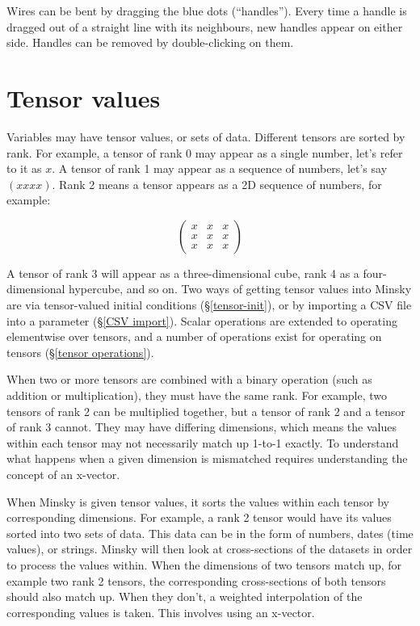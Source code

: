 Wires can be bent by dragging the blue dots (``handles''). Every time
a handle is dragged out of a straight line with its neighbours, new
handles appear on either side. Handles can be removed by
double-clicking on them.

\section{Tensor values}

Variables may have tensor values, or sets of data. Different tensors
are sorted by rank. For example, a tensor of rank 0 may appear as a
single number, let's refer to it as $x$. A tensor of rank 1 may appear
as a sequence of numbers, let's say $(x x x x)$. Rank 2 means a tensor
appears as a 2D sequence of numbers, for example:

\begin{displaymath}
  \left(
  \begin{array}{ccc}
    x& x& x\\
    x& x& x\\
    x& x& x
  \end{array}
  \right)
\end{displaymath}

A tensor of rank 3 will appear as a three-dimensional cube,
rank 4 as a four-dimensional hypercube, and so on. Two 
ways of getting tensor values into Minsky are via tensor-valued 
initial conditions (\S\ref{tensor-init}), or by importing a CSV 
file into a parameter (\S\ref{CSV import}). Scalar 
operations are extended to operating elementwise over tensors, 
and a number of operations exist for operating on tensors 
(\S\ref{tensor operations}).

When two or more tensors are combined with a binary operation (such 
as addition or multiplication), they must have the same rank. For example,
two tensors of rank 2 can be multiplied together, but a tensor of rank 2 and 
a tensor of rank 3 cannot. They may have differing dimensions, which means
the values within each tensor may not necessarily match up 1-to-1 exactly.
To understand what happens when a given dimension is mismatched requires 
understanding the concept of an x-vector.

When Minsky is given tensor values, it sorts the values within each tensor
by corresponding dimensions. For example, a rank 2 tensor would have its
values sorted into two sets of data. This data can be in the form of numbers,
dates (time values), or strings. Minsky will then look at cross-sections of the
datasets in order to process the values within. When the dimensions of two
tensors match up, for example two rank 2 tensors, the corresponding
cross-sections of both tensors should also match up. When they don't, a
weighted interpolation of the corresponding values is taken. This involves
using an x-vector. 

